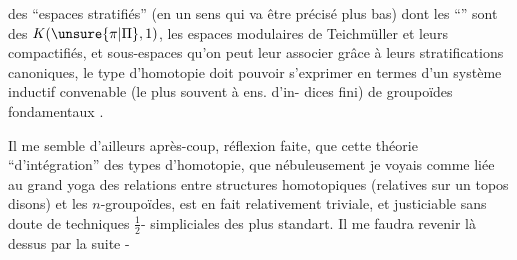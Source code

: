 des ``espaces stratifiés'' (en un sens qui
va être précisé plus bas) dont les
``'' sont des $K(\unsure{\pi|\Pi},1)$, 
les espaces modulaires de Teichmüller
et leurs compactifiés, et  sous-espaces
qu'on peut leur associer grâce à leurs
stratifications canoniques, le type
d'homotopie doit pouvoir s'exprimer
en termes d'un système inductif
convenable (le plus souvent à ens. d'in-
dices fini) de groupoïdes fondamentaux
 .

Il me semble d'ailleurs après-coup,
réflexion faite, que cette théorie ``d'intégration''
des types d'homotopie, que nébuleusement
je voyais comme liée au grand yoga des
relations entre structures homotopiques (relatives
sur un topos disons) et les $n$-groupoïdes,
est en fait relativement triviale, et
justiciable sans doute de techniques $\frac12$-
simpliciales des plus standart. Il me
faudra revenir là dessus par la suite -
